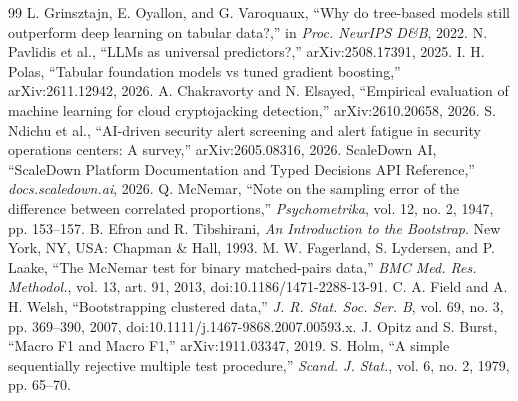 \documentclass[conference]{IEEEtran}
\begin{document}
\begin{thebibliography}{99}
 L. Grinsztajn, E. Oyallon, and G. Varoquaux, ``Why do tree-based models still outperform deep learning on tabular data?,'' in \emph{Proc. NeurIPS D\&B}, 2022.
 N. Pavlidis et al., ``LLMs as universal predictors?,'' arXiv:2508.17391, 2025.
 I. H. Polas, ``Tabular foundation models vs tuned gradient boosting,'' arXiv:2611.12942, 2026.
 A. Chakravorty and N. Elsayed, ``Empirical evaluation of machine learning for cloud cryptojacking detection,'' arXiv:2610.20658, 2026.
 S. Ndichu et al., ``AI-driven security alert screening and alert fatigue in security operations centers: A survey,'' arXiv:2605.08316, 2026.
 ScaleDown AI, ``ScaleDown Platform Documentation and Typed Decisions API Reference,'' \emph{docs.scaledown.ai}, 2026.
 Q. McNemar, ``Note on the sampling error of the difference between correlated proportions,'' \emph{Psychometrika}, vol. 12, no. 2, 1947, pp. 153--157.
 B. Efron and R. Tibshirani, \emph{An Introduction to the Bootstrap}. New York, NY, USA: Chapman \& Hall, 1993.
 M. W. Fagerland, S. Lydersen, and P. Laake, ``The McNemar test for binary matched-pairs data,'' \emph{BMC Med. Res. Methodol.}, vol. 13, art. 91, 2013, doi:10.1186/1471-2288-13-91.
 C. A. Field and A. H. Welsh, ``Bootstrapping clustered data,'' \emph{J. R. Stat. Soc. Ser. B}, vol. 69, no. 3, pp. 369--390, 2007, doi:10.1111/j.1467-9868.2007.00593.x.
 J. Opitz and S. Burst, ``Macro F1 and Macro F1,'' arXiv:1911.03347, 2019.
 S. Holm, ``A simple sequentially rejective multiple test procedure,'' \emph{Scand. J. Stat.}, vol. 6, no. 2, 1979, pp. 65--70.
\end{thebibliography}
\end{document}
